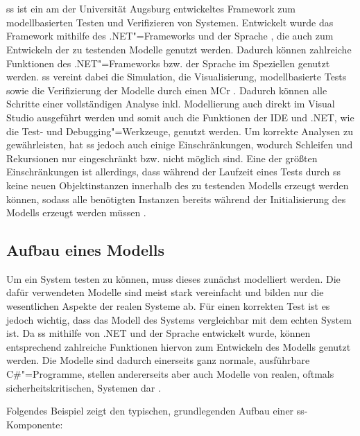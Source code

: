 \section{}
\label{sec:ssharp}

\gls{ss} ist ein am \isse der Universität Augsburg entwickeltes Framework zum modellbasierten Testen und Verifizieren von Systemen.
Entwickelt wurde das Framework mithilfe des .NET"=Frameworks und der Sprache \cS, die auch zum Entwickeln der zu testenden Modelle genutzt werden.
Dadurch können zahlreiche Funktionen des .NET"=Frameworks bzw. der Sprache \cS im Speziellen genutzt werden.
\gls{ss} vereint dabei die Simulation, die Visualisierung, modellbasierte Tests sowie die Verifizierung der Modelle durch einen \gls{MCr} \cite{Habermaier2015,Habermaier2016}.
Dadurch können alle Schritte einer vollständigen Analyse inkl. Modellierung auch direkt im Visual Studio ausgeführt werden und somit auch die Funktionen der IDE und .NET, wie \zB die Test- und Debugging"=Werkzeuge, genutzt werden.
Um korrekte Analysen zu gewährleisten, hat \gls{ss} jedoch auch einige Einschränkungen, wodurch \zB Schleifen und Rekursionen nur eingeschränkt bzw. nicht möglich sind.
Eine der größten Einschränkungen ist allerdings, dass während der Laufzeit eines Tests durch \gls{ss} keine neuen Objektinstanzen innerhalb des zu testenden Modells erzeugt werden können, sodass alle benötigten Instanzen bereits während der Initialisierung des Modells erzeugt werden müssen \cite{Habermaier2015}.

\subsection{Aufbau eines Modells}
\label{subsec:ssharpModel}

Um ein System testen zu können, muss dieses zunächst modelliert werden.
Die dafür verwendeten Modelle sind meist stark vereinfacht und bilden nur die wesentlichen Aspekte der realen Systeme ab.
Für einen korrekten Test ist es jedoch wichtig, dass das Modell des Systems vergleichbar mit dem echten System ist.
Da \gls{ss} mithilfe von .NET und der Sprache \cS entwickelt wurde, können entsprechend zahlreiche Funktionen hiervon zum Entwickeln des Modells genutzt werden.
Die Modelle sind dadurch einerseits ganz normale, ausführbare C\#"=Programme, stellen andererseits aber auch Modelle von realen, oftmals sicherheitskritischen, Systemen dar \cite{Habermaier2016}.

Folgendes Beispiel zeigt den typischen, grundlegenden Aufbau einer \gls{ss}-Komponente:

